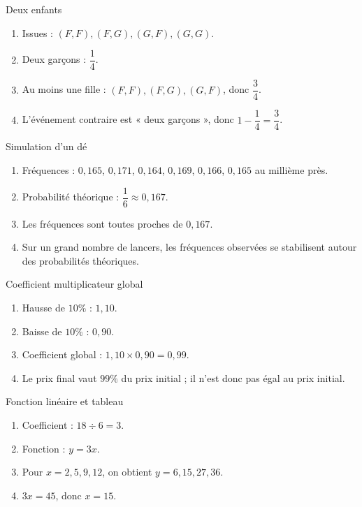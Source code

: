 \documentclass[11pt,a4paper]{article}
\newcounter{corr}
\begin{document}
\begin{corrbox}{Deux enfants}
\begin{enumerate}
\item Issues : $(F,F),(F,G),(G,F),(G,G)$.
\item Deux garçons : $\dfrac14$.
\item Au moins une fille : $(F,F),(F,G),(G,F)$, donc $\dfrac34$.
\item L'événement contraire est « deux garçons », donc $1-\dfrac14=\dfrac34$.
\end{enumerate}
\end{corrbox}

\begin{corrbox}{Simulation d'un dé}
\begin{enumerate}
\item Fréquences : $0{,}165$, $0{,}171$, $0{,}164$, $0{,}169$, $0{,}166$, $0{,}165$ au millième près.
\item Probabilité théorique : $\dfrac16\approx0{,}167$.
\item Les fréquences sont toutes proches de $0{,}167$.
\item Sur un grand nombre de lancers, les fréquences observées se stabilisent autour des probabilités théoriques.
\end{enumerate}
\end{corrbox}

\begin{corrbox}{Coefficient multiplicateur global}
\begin{enumerate}
\item Hausse de $10\%$ : $1{,}10$.
\item Baisse de $10\%$ : $0{,}90$.
\item Coefficient global : $1{,}10\times0{,}90=0{,}99$.
\item Le prix final vaut $99\%$ du prix initial ; il n'est donc pas égal au prix initial.
\end{enumerate}
\end{corrbox}

\begin{corrbox}{Fonction linéaire et tableau}
\begin{enumerate}
\item Coefficient : $18\div6=3$.
\item Fonction : $y=3x$.
\item Pour $x=2,5,9,12$, on obtient $y=6,15,27,36$.
\item $3x=45$, donc $x=15$.
\end{enumerate}
\end{corrbox}
\end{document}
